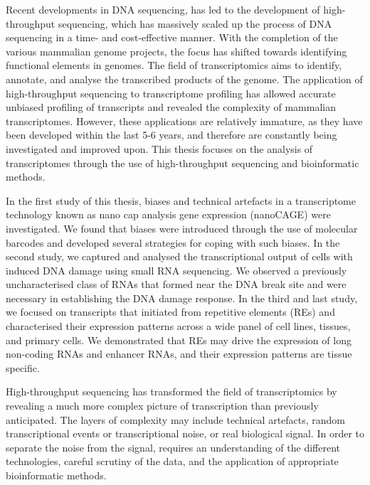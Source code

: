 Recent developments in DNA sequencing, has led to the development of high-throughput sequencing, which has massively scaled up the process of DNA sequencing in a time- and cost-effective manner. With the completion of the various mammalian genome projects, the focus has shifted towards identifying functional elements in genomes. The field of transcriptomics aims to identify, annotate, and analyse the transcribed products of the genome. The application of high-throughput sequencing to transcriptome profiling has allowed accurate unbiased profiling of transcripts and revealed the complexity of mammalian transcriptomes. However, these applications are relatively immature, as they have been developed within the last 5-6 years, and therefore are constantly being investigated and improved upon. This thesis focuses on the analysis of transcriptomes through the use of high-throughput sequencing and bioinformatic methods.

In the first study of this thesis, biases and technical artefacts in a transcriptome technology known as nano cap analysis gene expression (nanoCAGE) were investigated. We found that biases were introduced through the use of molecular barcodes and developed several strategies for coping with such biases. In the second study, we captured and analysed the transcriptional output of cells with induced DNA damage using small RNA sequencing. We observed a previously uncharacterised class of RNAs that formed near the DNA break site and were necessary in establishing the DNA damage response. In the third and last study, we focused on transcripts that initiated from repetitive elements (REs) and characterised their expression patterns across a wide panel of cell lines, tissues, and primary cells. We demonstrated that REs may drive the expression of long non-coding RNAs and enhancer RNAs, and their expression patterns are tissue specific.

High-throughput sequencing has transformed the field of transcriptomics by revealing a much more complex picture of transcription than previously anticipated. The layers of complexity may include technical artefacts, random transcriptional events or transcriptional noise, or real biological signal. In order to separate the noise from the signal, requires an understanding of the different technologies, careful scrutiny of the data, and the application of appropriate bioinformatic methods.
